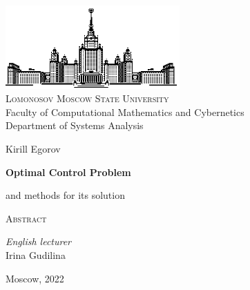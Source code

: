 \thispagestyle{empty}
\begin{center}
    \ \vspace{-3cm}

    \includegraphics[width=0.5\textwidth]{title_page/msu.eps}\\

    {\small{\scshape  Lomonosov Moscow State University}\\
    Faculty of Computational Mathematics and Cybernetics\\
    Department of Systems Analysis}

    \vfill

    {\Large Kirill Egorov}

    \vspace{1cm}

    {\LARGE\bfseries Optimal Control Problem\par and methods for its solution}

    \vspace{1.5cm}

    {\scshape Abstract}
\end{center}

\vspace{3cm}

\begin{flushright}
    \large
    \textit{English lecturer}\\
    Irina Gudilina 
\end{flushright}

\vfill

\begin{center}
    Moscow, 2022
\end{center}

\clearpage